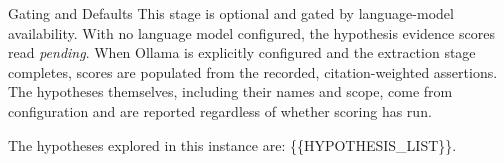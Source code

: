 \documentclass[
  ignorenonframetext,
]{beamer}
\begin{document}
\begin{frame}[allowframebreaks]{Gating and Defaults}
\label{gating-and-defaults}
This stage is optional and gated by language-model availability. With no
language model configured, the hypothesis evidence scores read
\emph{pending}. When Ollama is explicitly configured and the extraction
stage completes, scores are populated from the recorded,
citation-weighted assertions. The hypotheses themselves, including their
names and scope, come from configuration and are reported regardless of
whether scoring has run.

The hypotheses explored in this instance are: \{\{HYPOTHESIS\_LIST\}\}.
\end{frame}
\end{document}
